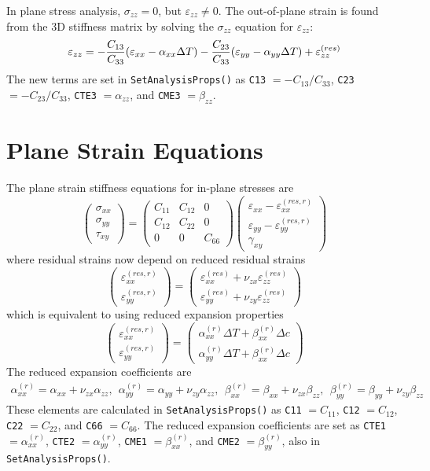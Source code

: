 \documentclass[11pt]{book}
\def\a#1{\alpha_{#1}}
\def\b#1{\beta_{#1}}
\def\code#1{{\small\tt #1}}
\def\DT{\Delta T}
\def\e#1{\varepsilon_{#1}}
\def\er#1{\varepsilon_{#1}^{(res)}}
\def\err#1{\varepsilon_{#1}^{(res,r)}}
\def\g#1{\gamma_{#1}}
\def\s#1{\sigma_{#1}}
\def\symmat#1#2#3#4#5#6{\left(\begin{array}{ccc} #1 & #2 & #3 \\ #2 & #4 & #5 \\
                                                      #3 & #5 & #6 \end{array}\right)}
\def\t#1{\tau_{#1}}
\def\v#1{\nu_{#1}}
\def\vvec#1#2#3{\left(\begin{array}{ccc} #1 \\ #2 \\ #3 \end{array}\right)}
\begin{document}
In plane stress analysis, $\s{zz}=0$, but $\e{zz}\ne0$. The out-of-plane strain is found from the 3D stiffness matrix by solving the $\s{zz}$ equation for $\e{zz}$:
\begin{equation}
            \e{zz} = -{C_{13}\over C_{33}}(\e{xx} -\a{xx}\DT) - {C_{23}\over C_{33}}(\e{yy} -\a{yy}\DT) 
                     + \er{zz}
\end{equation}
The new terms are set in \code{SetAnalysisProps()} as \code{C13} $=-C_{13}/C_{33}$, \code{C23} $=-C_{23}/C_{33}$, \code{CTE3} $=\a{zz}$, and \code{CME3} $=\b{zz}$.

\section{Plane Strain Equations}

The plane strain stiffness equations for in-plane stresses are
\begin{equation}
      \vvec{\s{xx}}{\s{yy}}{\t{xy}} = \symmat{C_{11}}{C_{12}}{0}{C_{22}}{0}{C_{66}}
          \vvec{\e{xx} -\err{xx}}{\e{yy} - \err{yy}}{\g{xy}}
 \end{equation}
 where residual strains now depend on reduced residual strains
\begin{equation}
\left(\begin{array}{c} \err{xx} \\ \err{yy}  \end{array}\right)
       =  \left(\begin{array}{c}
	 \er{xx} + \v{zx}\er{zz} \\
	\er{yy} + \v{zy}\er{zz} \end{array}\right)
\end{equation}
which is equivalent to using reduced expansion properties
\begin{equation}
\left(\begin{array}{c} \err{xx} \\ \err{yy}  \end{array}\right)
       =  \left(\begin{array}{c}
	 \a{xx}^{(r)}\DT + \b{xx}^{(r)}\Delta c \\
	\a{yy}^{(r)}\DT + \b{xx}^{(r)}\Delta c \end{array}\right)
\end{equation}
The reduced expansion coefficients are
\begin{eqnarray}%
   \a{xx}^{(r)} = \a{xx} + \v{zx}\a{zz}, \ \ 
   \a{yy}^{(r)} = \a{yy} + \v{zy}\a{zz}, \ \ 
   \b{xx}^{(r)} = \b{xx} + \v{zx}\b{zz}, \ \ 
   \b{yy}^{(r)} = \b{yy} + \v{zy}\b{zz}
\end{eqnarray}%
These elements are calculated in \code{SetAnalysisProps()} as \code{C11} $=C_{11}$, \code{C12}  $=C_{12}$, \code{C22} $=C_{22}$, and \code{C66} $=C_{66}$. The reduced expansion coefficients are set as \code{CTE1} $=\a{xx}^{(r)}$, \code{CTE2} $=\a{yy}^{(r)}$, \code{CME1} $=\b{xx}^{(r)}$, and \code{CME2} $=\b{yy}^{(r)}$, also in \code{SetAnalysisProps()}.
\end{document}
